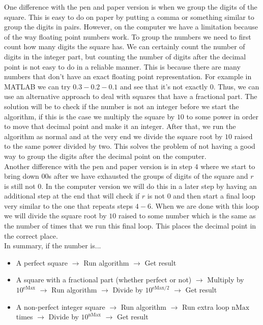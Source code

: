 \documentclass{uofa_template}
\begin{document}
\begin{enumerate}
One difference with the pen and paper version is when we group the digits of the square. This is easy to do on paper by putting a comma or something similar to group the digits in pairs. However, on the computer we have a limitation because of the way floating point numbers work. To group the numbers we need to first count how many digits the square has. We can certainly count the number of digits in the integer part, but counting the number of digits after the decimal point is not easy to do in a reliable manner. This is because there are many numbers that don't have an exact floating point representation. For example in MATLAB we can try $0.3 - 0.2 - 0.1$ and see that it's not exactly $0$. Thus, we can use an alternative approach to deal with squares that have a fractional part. The solution will be to check if the number is not an integer before we start the algorithm, if this is the case we multiply the square by $10$ to some power in order to move that decimal point and make it an integer. After that, we run the algorithm as normal and at the very end we divide the square root by $10$ raised to the same power divided by two. This solves the problem of not having a good way to group the digits after the decimal point on the computer. \\

Another difference with the pen and paper version is in step $4$ where we start to bring down $00$s after we have exhausted the groups of digits of the square and $r$ is still not $0$. In the computer version we will do this in a later step by having an additional step at the end that will check if $r$ is not $0$ and then start a final loop very similar to the one that repeats steps $4-6$. When we are done with this loop we will divide the square root by $10$ raised to some number which is the same as the number of times that we run this final loop. This places the decimal point in the correct place. \\

In summary, if the number is... \\
\begin{itemize}
\item A perfect square $\rightarrow$ Run algorithm $\rightarrow$ Get result \\
\item A square with a fractional part (whether perfect or not) $\rightarrow$ Multiply by $10^\text{eMax}$ $\rightarrow$ Run algorithm $\rightarrow$ Divide by $10^\text{eMax/2}$ $\rightarrow$ Get result \\
\item A non-perfect integer square $\rightarrow$ Run algorithm $\rightarrow$ Run extra loop $\text{nMax}$ times $\rightarrow$ Divide by $10^\text{nMax}$ $\rightarrow$ Get result \\
\end{itemize}


\end{enumerate}
\end{document}
